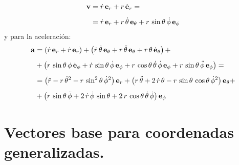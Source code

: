 \begin{align}
\begin{aligned}
\vb{v} &= \dot{r} \, \vb{e}_{r} + r \, \dot{\vb{e}}_{r} = \\[0.5em]
&= \dot{r} \, \vb{e}_{r} + r \, \dot{\theta} \, \vb{e}_{\theta} + r \, \sin \theta \, \dot{\phi} \, \vb{e}_{\phi}
\end{aligned}
\label{eq:ecuacion_02_51}
\end{align}
y para la aceleración:
\begin{align}
\begin{aligned}[b]
\vb{a} &= \left( \dot{r} \, \vb{e}_{r} + \dot{r} \, \vb{e}_{r} \right) + \left( \dot{r} \, \dot{\theta} \, \vb{e}_{\theta} + r \, \ddot{\theta} \, \vb{e}_{\theta} + r \, \theta \, \dot{\vb{e}}_{\theta} \right) + \\[0.5em]
&+ \left( r \, \sin \theta \, \phi \, \dot{\vb{e}}_{\phi} + \dot{r} \, \sin \theta \, \dot{\phi} \, \vb{e}_{\phi} + r \, \cos \theta \, \dot{\theta} \, \dot{\phi} \, \vb{e}_{\phi} + r \, \sin \theta \, \ddot{\phi} \, \vb{e}_{\phi} \right) = \\[0.5em]
&= \left( \ddot{r} - r \, \dot{\theta}^{2} - r \, \sin^{2} \theta \, \dot{\phi}^{2} \right) \vb{e}_{r} + \left( r \, \ddot{\theta} + 2 \, \dot{r} \, \theta - r \, \sin \theta \, \cos \theta \, \dot{\phi}^{2} \right) \vb{e}_{\theta} + \\[0.5em]
&+ \left( r \, \sin \theta \, \ddot{\phi} + 2 \, \dot{r} \, \dot{\phi} \, \sin \theta + 2 \, r \, \cos \theta \, \dot{\theta} \, \dot{\phi} \right) \vb{e}_{\phi}
\end{aligned}
\label{eq:ecuacion_02_52}
\end{align}

\section{Vectores base para coordenadas generalizadas.}

